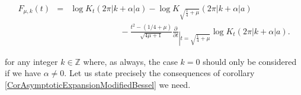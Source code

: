 \documentclass{jams-l}
\theoremstyle{definition}
\theoremstyle{remark}
\numberwithin{equation}{section}
\begin{document}
        \begin{equation}
        \label{EqFmuk}
            \begin{array}{lll}
                F_{\mu,k} \left( t \right) & = & \log K_t \left( 2 \pi \left \vert k + \alpha \right \vert a \right) - \log K_{\sqrt{\frac{1}{4} + \mu}} \left( 2 \pi \left \vert k + \alpha \right \vert a \right) \\[1em]
                    
                && \qquad \qquad \qquad - \frac{t^2 - \left( 1/4 + \mu \right)}{\sqrt{4 \mu + 1}} \frac{\partial}{\partial t}_{\left \vert t = \sqrt{\frac{1}{4} + \mu} \right.} \log K_t \left( 2 \pi \left \vert k + \alpha \right \vert a \right).
            \end{array}
        \end{equation}
        
        \noindent for any integer $k \in \mathbb{Z}$ where, as always, the case $k = 0$ should only be considered if we have $\alpha \neq 0$. Let us state precisely the consequences of corollary \ref{CorAsymptoticExpansionModifiedBessel} we need.
        
\end{document}
